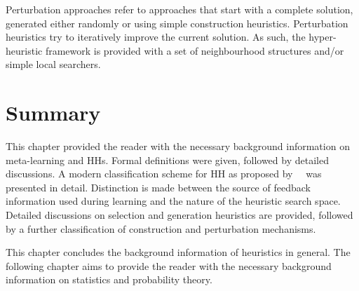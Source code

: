 Perturbation  approaches refer to approaches that start with a complete solution, generated either randomly or using simple construction heuristics.  Perturbation heuristics try to iteratively improve the current solution. As such, the hyper-heuristic framework is provided with a set of neighbourhood structures and/or simple local searchers.


\section{Summary}\label{sec:hh:summary}

This chapter provided the reader with the necessary background information on meta-learning and \acp{HH}. Formal definitions were given, followed by detailed discussions. A modern classification scheme for \acs{HH} as proposed by~\citeauthor{ref:burke:2010}~\cite{ref:burke:2010} was presented in detail. Distinction is made between the source of feedback information used during learning and the nature of the heuristic search space. Detailed discussions on selection and generation heuristics are provided, followed by a further classification of construction and perturbation mechanisms.

This chapter concludes the background information of heuristics in general. The following chapter aims to provide the reader with the necessary background information on statistics and probability theory.